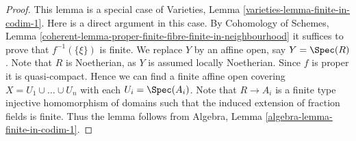 \begin{proof}
This lemma is a special case of
Varieties, Lemma \ref{varieties-lemma-finite-in-codim-1}.
Here is a direct argument in this case.
By Cohomology of Schemes,
Lemma \ref{coherent-lemma-proper-finite-fibre-finite-in-neighbourhood}
it suffices to prove that $f^{-1}(\{\xi\})$ is finite.
We replace $Y$ by an affine open, say $Y = \Spec(R)$.
Note that $R$ is Noetherian, as $Y$ is assumed locally Noetherian.
Since $f$ is proper it is quasi-compact. Hence we can find a finite
affine open covering $X = U_1 \cup \ldots \cup U_n$ with
each $U_i = \Spec(A_i)$. Note that $R \to A_i$ is a
finite type injective homomorphism of domains such that
the induced extension of fraction fields is finite.
Thus the lemma follows
from Algebra, Lemma \ref{algebra-lemma-finite-in-codim-1}.
\end{proof}


